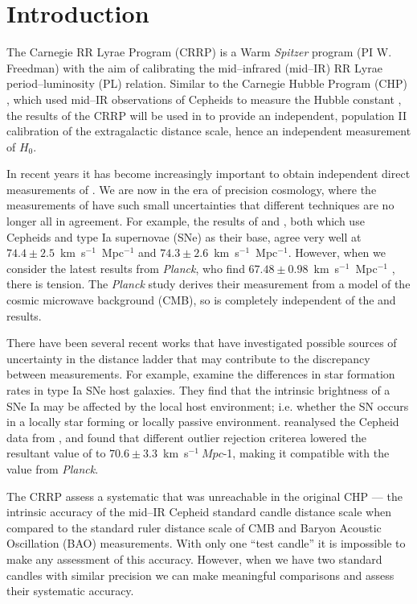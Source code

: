 \section{Introduction}
\label{sec:intro}

The Carnegie RR Lyrae Program (CRRP) is a Warm {\it Spitzer} program (PI W. Freedman) with the aim of calibrating the mid--infrared (mid--IR) RR Lyrae period--luminosity (PL) relation. Similar to the Carnegie Hubble Program (CHP) \citep{2011AJ....142..192F}, which used mid--IR observations of Cepheids to measure the Hubble constant \citep[$H_{0}$][]{2012ApJ...758...24F}, the results of the CRRP will be used in to provide an independent, population II calibration of the extragalactic distance scale, hence an independent measurement of $H_{0}$. 

In recent years it has become increasingly important to obtain independent direct measurements of \ho. We are now in the era of precision cosmology, where the measurements of \ho have such small uncertainties that different techniques are no longer all in agreement. For example, the results of  \citet{2011ApJ...730..119R} and \citet{2012ApJ...758...24F}, both which use Cepheids and type Ia supernovae (SNe) as their base, agree very well at $74.4\pm 2.5$~km~s$^{-1}$~Mpc$^{-1}$ and $74.3\pm2.6$~km~s$^{-1}$~Mpc$^{-1}$. However, when we consider the latest results from {\it Planck}, who find $67.48\pm0.98$~km~s$^{-1}$~Mpc$^{-1}$ \citep{2015arXiv150201589P}, there is tension. The {\it Planck} study derives their measurement from a model of the cosmic microwave background (CMB), so is completely independent of the \citeauthor{2011ApJ...730..119R} and \citeauthor{2012ApJ...758...24F} results. 

There have been several recent works that have investigated possible sources of uncertainty in the distance ladder that may contribute to the discrepancy between \ho measurements. For example, \citet{2015ApJ...802...20R} examine the differences in star formation rates in type Ia SNe host galaxies. They find that the intrinsic brightness of a SNe Ia may be affected by the local host environment; i.e. whether the SN occurs in a locally star forming or locally passive environment. \citet{2014MNRAS.440.1138E} reanalysed the Cepheid data from \citet{2011ApJ...730..119R}, and found that different outlier rejection criterea lowered the resultant value of \ho to $70.6 \pm 3.3$~km~s$^{-1}~Mpc${-1}, making it compatible with the value from {\it Planck}. 

The CRRP assess a systematic that was unreachable in the original CHP --- the intrinsic accuracy of the mid--IR Cepheid standard candle distance scale when compared to the standard ruler distance scale of CMB and Baryon Acoustic Oscillation (BAO) measurements. With only one ``test candle'' it is impossible to make any assessment of this accuracy. However, when we have two standard candles with similar precision we can make meaningful comparisons and assess their systematic accuracy.

